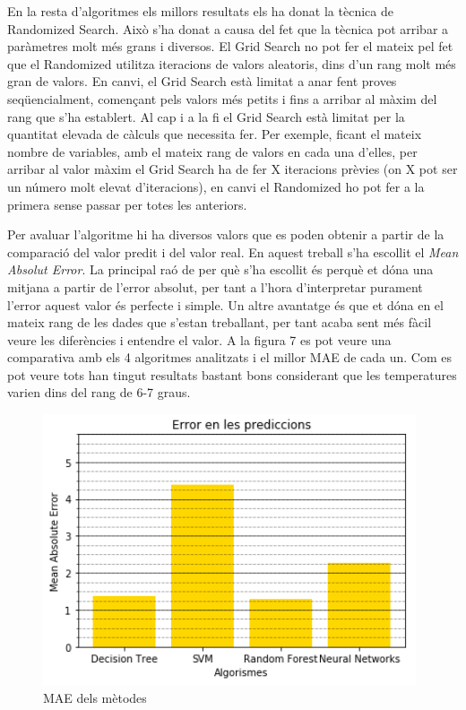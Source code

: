 \documentclass[10pt,a4paper,twocolumn,twoside]{article}
\begin{document}
En la resta d'algoritmes els millors resultats els ha donat la tècnica de Randomized Search. Això s'ha donat a causa del fet que la tècnica pot arribar a paràmetres molt més grans i diversos. El Grid Search no pot fer el mateix pel fet que el Randomized utilitza iteracions de valors aleatoris, dins d'un rang molt més gran de valors. En canvi, el Grid Search està limitat a anar fent proves seqüencialment, començant pels valors més petits i fins a arribar al màxim del rang que s'ha establert. Al cap i a la fi el Grid Search està limitat per la quantitat elevada de càlculs que necessita fer. Per exemple, ficant el mateix nombre de variables, amb el mateix rang de valors en cada una d'elles, per arribar al valor màxim el Grid Search ha de fer X iteracions prèvies (on X pot ser un número molt elevat d'iteracions), en canvi el Randomized ho pot fer a la primera sense passar per totes les anteriors.

Per avaluar l'algoritme hi ha diversos valors que es poden obtenir a partir de la comparació del valor predit i del valor real. En aquest treball s'ha escollit el \textit{Mean Absolut Error}. La principal raó de per què s'ha escollit és perquè et dóna una mitjana a partir de l'error absolut, per tant a l'hora d'interpretar purament l'error aquest valor és perfecte i simple. Un altre avantatge és que et dóna en el mateix rang de les dades que s'estan treballant, per tant acaba sent més fàcil veure les diferències i entendre el valor. A la figura 7 es pot veure una comparativa amb els 4 algoritmes analitzats i el millor MAE de cada un. Com es pot veure tots han tingut resultats bastant bons considerant que les temperatures varien dins del rang de 6-7 graus.

\begin{figure}[!h]
	\includegraphics[scale=0.8,center]{../img/comparacioMetricsAlgs}
	\caption{MAE dels mètodes}
	\label{fig-Metrics}
\end{figure}
\end{document}
